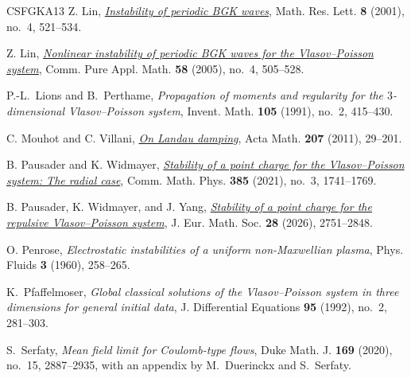 \documentclass[10pt,reqno]{amsart}
\theoremstyle{definition}
\begin{document}
{\begin{thebibliography}{CSFGKA13}
Z. Lin,
\href{https://link.intlpress.com/JDetail/1806606498308452354}{\emph{Instability of periodic BGK waves}},
Math. Res. Lett. \textbf{8} (2001), no.~4, 521--534.

Z. Lin,
\href{https://onlinelibrary.wiley.com/doi/abs/10.1002/cpa.20028}{\emph{Nonlinear instability of periodic BGK waves for the Vlasov--Poisson system}},
Comm. Pure Appl. Math. \textbf{58} (2005), no.~4, 505--528.





P.-L.~Lions and B.~Perthame,
\emph{Propagation of moments and regularity for the $3$-dimensional Vlasov--Poisson system},
Invent. Math. \textbf{105} (1991), no.~2, 415--430.






C. Mouhot and C. Villani,
\href{https://projecteuclid.org/journals/acta-mathematica/volume-207/issue-1/On-Landau-damping/10.1007/s11511-011-0068-9.full}{\emph{On Landau damping}},
Acta Math. \textbf{207} (2011), 29--201.





B. Pausader and K. Widmayer,
\href{https://link.springer.com/article/10.1007/s00220-021-04117-8}{\emph{Stability of a point charge for the Vlasov--Poisson system: The radial case}},
Comm. Math. Phys. \textbf{385} (2021), no.~3, 1741--1769.

B. Pausader, K. Widmayer, and J. Yang,
\href{https://doi.org/10.4171/JEMS/1518}{\emph{Stability of a point charge for the repulsive Vlasov--Poisson system}},
J. Eur. Math. Soc. \textbf{28} (2026), 2751--2848.

O. Penrose,
\emph{Electrostatic instabilities of a uniform non-Maxwellian plasma},
Phys. Fluids \textbf{3} (1960), 258--265.




K.~Pfaffelmoser,
\emph{Global classical solutions of the Vlasov--Poisson system in three dimensions for general initial data},
J. Differential Equations \textbf{95} (1992), no.~2, 281--303.





S.~Serfaty,
\emph{Mean field limit for Coulomb-type flows},
Duke Math. J. \textbf{169} (2020), no.~15, 2887--2935, with an appendix by M.~Duerinckx and S.~Serfaty.






\end{thebibliography}}
\end{document}
